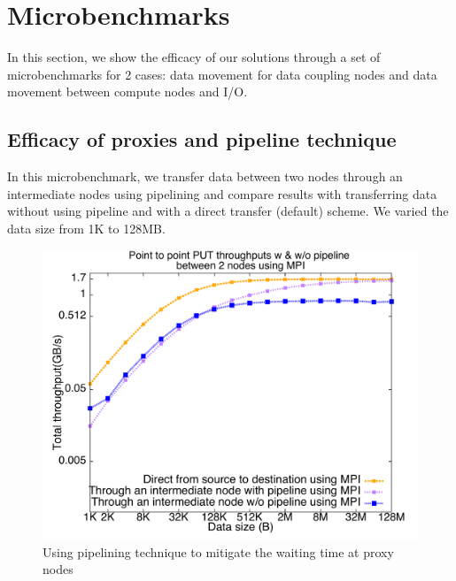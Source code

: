 \section{Microbenchmarks}
\label{sec:microbenchmarks}
In this section, we show the efficacy of our solutions through a set of microbenchmarks for 2 cases: data movement for data coupling nodes and data movement between compute nodes and I/O.

\subsection{Efficacy of proxies and pipeline technique}


In this microbenchmark, we transfer data between two nodes through an intermediate nodes using pipelining and compare results with transferring data without using pipeline and with a direct transfer (default) scheme. We varied the data size from 1K  to 128MB.

\begin{figure}[!htb]
\centering
\includegraphics[scale=0.3]{figures/pipeline_mpi.pdf}
\caption{Using pipelining technique to mitigate the waiting time at proxy nodes}
\label{fig:pipeline_mpi}
\end{figure}

